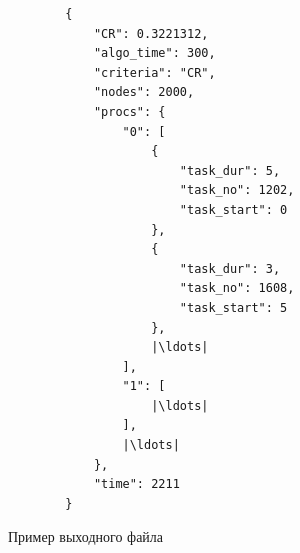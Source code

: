 \begin{listing}[!htbp]
    \begin{verbatim}
        {  
            "CR": 0.3221312,  
            "algo_time": 300, 
            "criteria": "CR", 
            "nodes": 2000, 
            "procs": { 
                "0": [ 
                    { 
                        "task_dur": 5, 
                        "task_no": 1202, 
                        "task_start": 0 
                    }, 
                    { 
                        "task_dur": 3, 
                        "task_no": 1608, 
                        "task_start": 5 
                    },
                    |\ldots|
                ], 
                "1": [ 
                    |\ldots|
                ], 
                |\ldots|
            }, 
            "time": 2211 
        }
    \end{verbatim}
    \caption{Пример выходного файла}
    \label{lst:output-file}
\end{listing}
